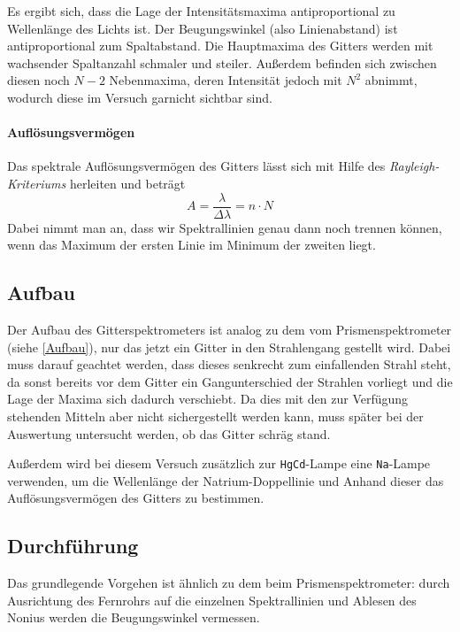 \documentclass[a4paper, 11pt]{article}
\begin{document}
Es ergibt sich, dass die Lage der Intensitätsmaxima antiproportional zu Wellenlänge des Lichts ist. Der Beugungswinkel (also Linienabstand) ist antiproportional zum Spaltabstand.
Die Hauptmaxima des Gitters werden mit wachsender Spaltanzahl schmaler und steiler. Außerdem befinden sich zwischen diesen noch $N-2$ Nebenmaxima, deren Intensität jedoch mit $N^2$ abnimmt, wodurch diese im Versuch garnicht sichtbar sind.


\clearpage
\paragraph{Auflösungsvermögen}
Das spektrale Auflösungsvermögen des Gitters lässt sich mit Hilfe des \textit{Rayleigh-Kriteriums} herleiten und beträgt
\begin{equation}\label{eq:AGitter}
A = \frac{\lambda}{\Delta\lambda} = n \cdot N
\end{equation}
Dabei nimmt man an, dass wir Spektrallinien genau dann noch trennen können, wenn das Maximum der ersten Linie im Minimum der zweiten liegt.




\subsection{Aufbau}
Der Aufbau des Gitterspektrometers ist analog zu dem vom Prismenspektrometer (siehe \ref{Aufbau}), nur das jetzt ein Gitter in den Strahlengang gestellt wird. Dabei muss darauf geachtet werden, dass dieses senkrecht zum einfallenden Strahl steht, da sonst bereits vor dem Gitter ein Gangunterschied der Strahlen vorliegt und die Lage der Maxima sich dadurch verschiebt. Da dies mit den zur Verfügung stehenden Mitteln aber nicht sichergestellt werden kann, muss später bei der Auswertung untersucht werden, ob das Gitter schräg stand.

Außerdem wird bei diesem Versuch zusätzlich zur \texttt{HgCd}-Lampe eine \texttt{Na}-Lampe verwenden, um die Wellenlänge der Natrium-Doppellinie und Anhand dieser das Auflösungsvermögen des Gitters zu bestimmen.


\subsection{Durchführung}
Das grundlegende Vorgehen ist ähnlich zu dem beim Prismenspektrometer: durch Ausrichtung des Fernrohrs auf die einzelnen Spektrallinien und Ablesen des Nonius werden die Beugungswinkel vermessen.
\end{document}
